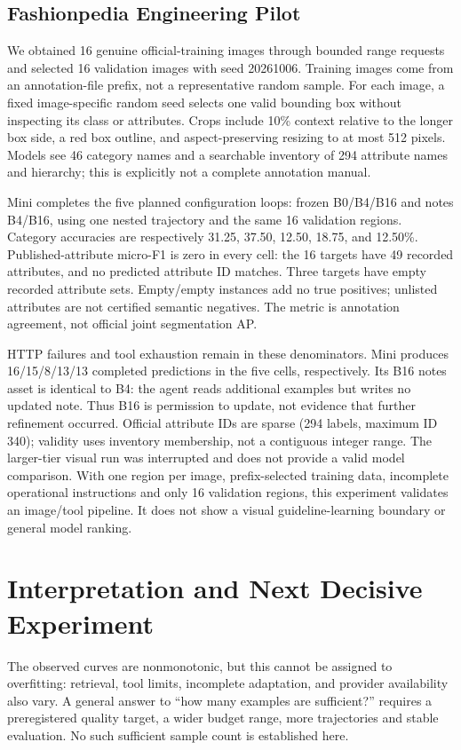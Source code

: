 \documentclass[11pt]{article}
\begin{document}
\subsection{Fashionpedia Engineering Pilot}
We obtained 16 genuine official-training images through bounded range requests and selected 16 validation images with seed 20261006. Training images come from an annotation-file prefix, not a representative random sample. For each image, a fixed image-specific random seed selects one valid bounding box without inspecting its class or attributes. Crops include 10\% context relative to the longer box side, a red box outline, and aspect-preserving resizing to at most 512 pixels. Models see 46 category names and a searchable inventory of 294 attribute names and hierarchy; this is explicitly not a complete annotation manual.

Mini completes the five planned configuration loops: frozen B0/B4/B16 and notes B4/B16, using one nested trajectory and the same 16 validation regions. Category accuracies are respectively 31.25, 37.50, 12.50, 18.75, and 12.50\%. Published-attribute micro-F1 is zero in every cell: the 16 targets have 49 recorded attributes, and no predicted attribute ID matches. Three targets have empty recorded attribute sets. Empty/empty instances add no true positives; unlisted attributes are not certified semantic negatives. The metric is annotation agreement, not official joint segmentation AP.

HTTP failures and tool exhaustion remain in these denominators. Mini produces 16/15/8/13/13 completed predictions in the five cells, respectively. Its B16 notes asset is identical to B4: the agent reads additional examples but writes no updated note. Thus B16 is permission to update, not evidence that further refinement occurred. Official attribute IDs are sparse (294 labels, maximum ID 340); validity uses inventory membership, not a contiguous integer range. The larger-tier visual run was interrupted and does not provide a valid model comparison. With one region per image, prefix-selected training data, incomplete operational instructions and only 16 validation regions, this experiment validates an image/tool pipeline. It does not show a visual guideline-learning boundary or general model ranking.

\section{Interpretation and Next Decisive Experiment}
The observed curves are nonmonotonic, but this cannot be assigned to overfitting: retrieval, tool limits, incomplete adaptation, and provider availability also vary. A general answer to ``how many examples are sufficient?'' requires a preregistered quality target, a wider budget range, more trajectories and stable evaluation. No such sufficient sample count is established here.
\end{document}
